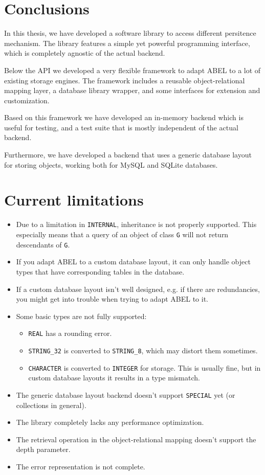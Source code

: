 \section{Conclusions}

In this thesis, we have developed a software library to access different persitence mechanism.
The library features a simple yet powerful programming interface, which is completely agnostic of the actual backend.

Below the API we developed a very flexible framework to adapt ABEL to a lot of existing storage engines.
The framework includes a reusable object-relational mapping layer, a database library wrapper, and some interfaces for extension and customization.

Based on this framework we have developed an in-memory backend which is useful for testing, and a test suite that is mostly independent of the actual backend.

Furthermore, we have developed a backend that uses a generic data\-base layout for storing objects, working both for MySQL and SQLite data\-bases.

\section{Current limitations}

\begin{itemize}
\item Due to a limitation in \lstinline!INTERNAL!, inheritance is not properly supported.
This especially means that a query of an object of class \lstinline!G! will not return descendants of \lstinline!G!.
\item If you adapt ABEL to a custom database layout, it can only handle object types that have corresponding tables in the database.
\item If a custom database layout isn't well designed, e.g. if there are redundancies, you might get into trouble when trying to adapt ABEL to it.
\item Some basic types are not fully supported:
\begin{itemize}
	\item \lstinline!REAL! has a rounding error.
	\item \lstinline!STRING_32! is converted to \lstinline!STRING_8!, which may distort them sometimes.
	\item \lstinline!CHARACTER! is converted to \lstinline!INTEGER! for storage.
	This is usually fine, but in custom database layouts it results in a type mismatch.
\end{itemize}
\item The generic database layout backend doesn't support \lstinline!SPECIAL! yet (or collections in general).
\item The library completely lacks any performance optimization.
\item The retrieval operation in the object-relational mapping doesn't support the depth parameter.
\item The error representation is not complete.
\end{itemize}

